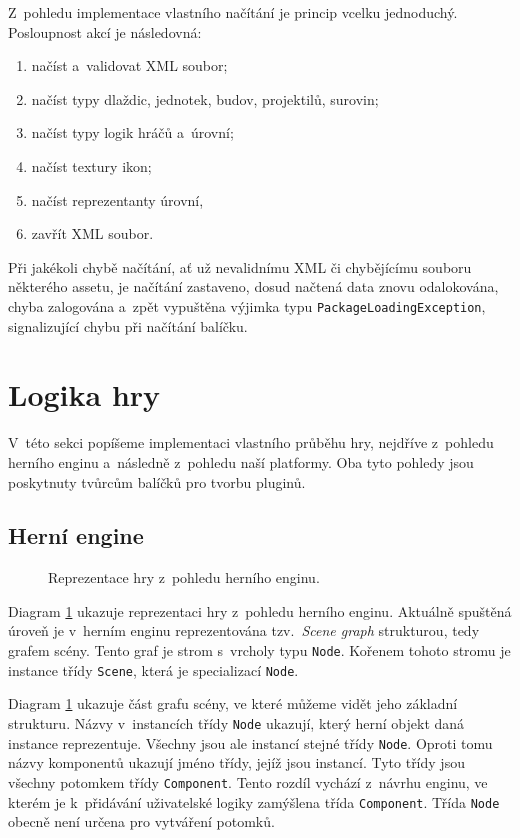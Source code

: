 Z~pohledu implementace vlastního načítání je princip vcelku jednoduchý. Posloupnost akcí je následovná:

\begin{enumerate}
	\item načíst a~validovat XML soubor;
	\item načíst typy dlaždic, jednotek, budov, projektilů, surovin;
	\item načíst typy logik hráčů a~úrovní;
	\item načíst textury ikon;
	\item načíst reprezentanty úrovní,
	\item zavřít XML soubor.
\end{enumerate}

Při jakékoli chybě načítání, ať už nevalidnímu XML či chybějícímu souboru některého assetu, je načítání zastaveno, dosud načtená data znovu odalokována, chyba zalogována a~zpět vypuštěna výjimka typu \texttt{PackageLoadingException}, signalizující chybu při načítání balíčku.

\section{Logika hry}
V~této sekci popíšeme implementaci vlastního průběhu hry, nejdříve z~pohledu herního enginu a~následně z~pohledu naší platformy. Oba tyto pohledy jsou poskytnuty tvůrcům balíčků pro tvorbu pluginů.

\subsection{Herní engine}
\label{sec:engineview}

\begin{figure}[h]
	\centering
	\fontsize{8pt}{11pt}\selectfont
	\def\svgwidth{\textwidth}
	
	\caption{Reprezentace hry z~pohledu herního enginu.}
	\label{fig:scenegraph}
\end{figure}


Diagram \ref{fig:scenegraph} ukazuje reprezentaci hry z~pohledu herního enginu. Aktuálně spuštěná úroveň je v~herním enginu reprezentována tzv.~\textit{Scene graph} strukturou, tedy grafem scény. Tento graf je strom s~vrcholy typu \texttt{Node}. Kořenem tohoto stromu je instance třídy \texttt{Scene}, která je specializací \texttt{Node}.

Diagram \ref{fig:scenegraph} ukazuje část grafu scény, ve které můžeme vidět jeho základní strukturu. Názvy v~instancích třídy \texttt{Node} ukazují, který herní objekt daná instance reprezentuje. Všechny jsou ale instancí stejné třídy \texttt{Node}. Oproti tomu názvy komponentů ukazují jméno třídy, jejíž jsou instancí. Tyto třídy jsou všechny potomkem třídy \texttt{Component}. Tento rozdíl vychází z~návrhu enginu, ve kterém je k~přidávání uživatelské logiky zamýšlena třída \texttt{Component}. Třída \texttt{Node} obecně není určena pro vytváření potomků.

